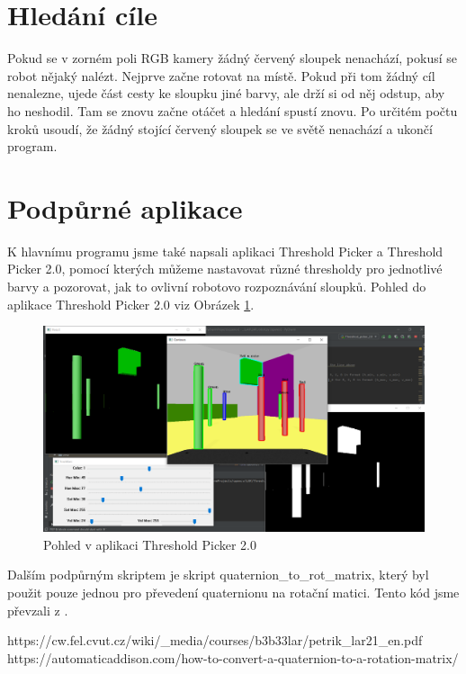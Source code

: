 \documentclass{article}
\begin{document}
\section{Hledání cíle}
Pokud se v zorném poli RGB kamery žádný červený sloupek nenachází, pokusí se robot nějaký nalézt. Nejprve začne rotovat na místě. Pokud při tom žádný cíl nenalezne, ujede část cesty ke sloupku jiné barvy, ale drží si od něj odstup, aby ho neshodil. Tam se znovu začne otáčet a hledání spustí znovu. Po určitém počtu kroků usoudí, že žádný stojící červený sloupek se ve světě nenachází a ukončí program.
\section{Podpůrné aplikace}
K hlavnímu programu jsme také napsali aplikaci Threshold Picker a Threshold Picker 2.0, pomocí kterých můžeme nastavovat různé thresholdy pro jednotlivé barvy a pozorovat, jak to ovlivní robotovo rozpoznávání sloupků. Pohled do aplikace Threshold Picker 2.0 viz Obrázek \ref{thr_picker}.
\begin{figure}[h]
\includegraphics[width=\textwidth]{Threshold_Picker.png}
\caption{Pohled v aplikaci Threshold Picker 2.0}
\label{thr_picker}
\end{figure}
Dalším podpůrným skriptem je skript quaternion\_to\_rot\_matrix, který byl použit pouze jednou pro převedení quaternionu na rotační matici. Tento kód jsme převzali z \cite{quaterniony}.

\begin{thebibliography}{}

https://cw.fel.cvut.cz/wiki/\_media/courses/b3b33lar/petrik\_lar21\_en.pdf
https://automaticaddison.com/how-to-convert-a-quaternion-to-a-rotation-matrix/
\end{thebibliography}
\end{document}
